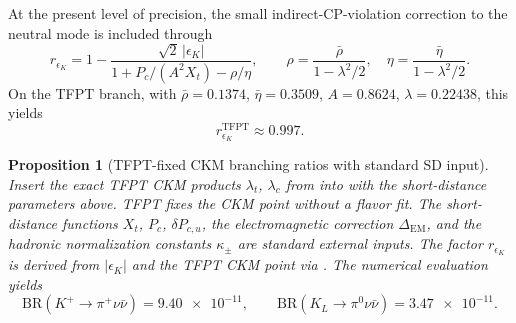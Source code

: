 \documentclass[11pt,a4paper]{article}
\newtheorem{proposition}[theorem]{Proposition}
\theoremstyle{definition}
\theoremstyle{remark}
\newcommand{\BR}{\mathrm{BR}}
\numberwithin{equation}{section}
\begin{document}
At the present level of precision, the small indirect-CP-violation
correction to the neutral mode is included through \cite{BrodGorbahnStamou}
\begin{equation}
\label{eq:r-epsilon-K}
r_{\epsilon_K}
=
1
-\frac{\sqrt{2}\,|\epsilon_K|}
{1+P_c/(A^2 X_t)-\rho/\eta},
\qquad
\rho=\frac{\bar\rho}{1-\lambda^2/2},
\quad
\eta=\frac{\bar\eta}{1-\lambda^2/2}.
\end{equation}
On the TFPT branch, with $\bar\rho=0.1374$, $\bar\eta=0.3509$,
$A=0.8624$, $\lambda=0.22438$, this yields
\begin{equation}
\label{eq:r-epsilon-K-value}
r_{\epsilon_K}^{\mathrm{TFPT}}\approx 0.997.
\end{equation}

\begin{tcolorbox}[colback=blue!3, colframe=blue!50!black, breakable,
    title={\textbf{TFPT-fixed rare kaon prediction}}, fonttitle=\bfseries]
\begin{proposition}[TFPT-fixed CKM branching ratios with standard SD input]
\label{prop:br-prediction}
Insert the exact TFPT CKM products $\lambda_t$, $\lambda_c$ from
 into
 with the short-distance parameters above.
TFPT fixes the CKM point without a flavor fit.
The short-distance functions $X_t$, $P_c$, $\delta P_{c,u}$, the
electromagnetic correction $\Delta_{\mathrm{EM}}$, and the hadronic
normalization constants $\kappa_\pm$ are standard external inputs.
The factor $r_{\epsilon_K}$ is derived from $|\epsilon_K|$ and the
TFPT CKM point via .
The numerical evaluation yields
\begin{equation}
\label{eq:br-values}
\boxed{
\BR(K^+\!\to\pi^+\nu\bar\nu)
=
\num{9.40e-11},
\qquad
\BR(K_L\to\pi^0\nu\bar\nu)
=
\num{3.47e-11}.
}
\end{equation}
\end{proposition}
\end{tcolorbox}
\end{document}
